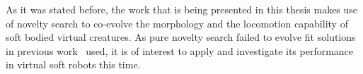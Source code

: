 As it was stated before, the work that is being presented in this thesis makes use of novelty search to co-evolve the morphology and the locomotion capability of soft bodied virtual creatures. As pure novelty search failed to evolve fit solutions in previous work~\citep{lehman2011evolving} used, it is of interest to apply and investigate its performance in virtual soft robots this time.


